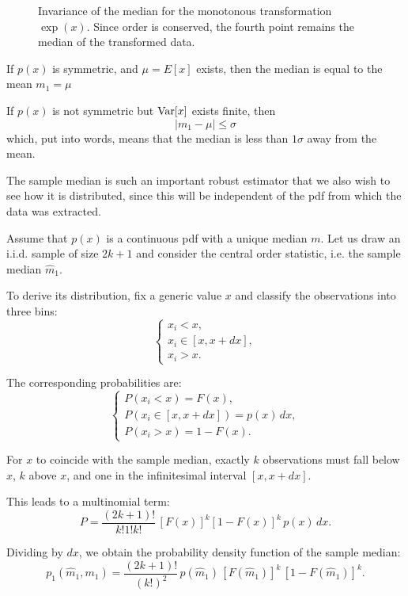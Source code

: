 \begin{figure}[H]
	\centering
	
	\caption{Invariance of the median for the monotonous transformation $\exp(x)$. Since order is conserved, the fourth point remains the median of the transformed data.}
\end{figure}


\begin{theorem}
	If $p(x)$ is symmetric, and $\mu = E[x]$ exists, then the median is equal to the mean $m_1 = \mu$
	
	If $p(x)$ is not symmetric but $\operatorname{Var}[x]$ exists finite, then 
	\[
	\left|m_1-\mu\right| \leq \sigma
	\]
	which, put into words, means that the median is less than $1\sigma$ away from the mean. 
\end{theorem}

The sample median is such an important robust estimator that we also wish to see how it is distributed, since this will be independent of the pdf from which the data was extracted.

Assume that $p(x)$ is a continuous pdf with a unique median $m$. Let us draw an i.i.d. sample of size $2k+1$ and consider the central order statistic, i.e. the sample median $\hat m_1$.

To derive its distribution, fix a generic value $x$ and classify the observations into three bins:
\[
\begin{cases}
	x_i < x, \\
	x_i \in [x, x+dx], \\
	x_i > x.
\end{cases}
\]

The corresponding probabilities are:
\[
\begin{cases}
	P(x_i < x) = F(x), \\
	P(x_i \in [x,x+dx]) = p(x)\,dx, \\
	P(x_i > x) = 1 - F(x).
\end{cases}
\]

For $x$ to coincide with the sample median, exactly $k$ observations must fall below $x$, $k$ above $x$, and one in the infinitesimal interval $[x,x+dx]$.

This leads to a multinomial term:
\[
P =
\frac{(2k+1)!}{k!1!k!}\,[F(x)]^k [1-F(x)]^k \, p(x)\,dx.
\]

Dividing by $dx$, we obtain the probability density function of the sample median:
\begin{equation}
	p_1(\hat m_1, m_1)
	=
	\frac{(2k+1)!}{(k!)^2}
	\, p(\hat m_1)\,
	[F(\hat m_1)]^k\,[1-F(\hat m_1)]^k.
	\label{eq:median_pdf}
\end{equation}

